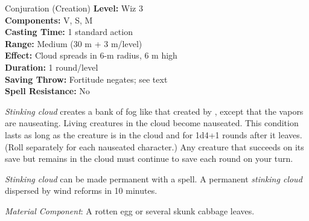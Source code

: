 {Conjuration (Creation)}
{
	\textbf{Level:}
	Wiz 3\\
	\textbf{Components:}
	V, S, M\\
	\textbf{Casting Time:}
	1 standard action\\
	\textbf{Range:}
	Medium (30 m + 3 m/level)\\
	\textbf{Effect:}
	Cloud spreads in 6-m radius, 6 m high\\
	\textbf{Duration:}
	1 round/level\\
	\textbf{Saving Throw:}
	Fortitude negates; see text\\
	\textbf{Spell Resistance:}
	No\\
}
{
	\emph{Stinking cloud} creates a bank of fog like that created by , except that the vapors are nauseating. Living creatures in the cloud become nauseated. This condition lasts as long as the creature is in the cloud and for 1d4+1 rounds after it leaves. (Roll separately for each nauseated character.) Any creature that succeeds on its save but remains in the cloud must continue to save each round on your turn.

	\emph{Stinking cloud} can be made permanent with a  spell. A permanent \emph{stinking cloud} dispersed by wind reforms in 10 minutes.

	\textit{Material Component}:
	A rotten egg or several skunk cabbage leaves.

}
